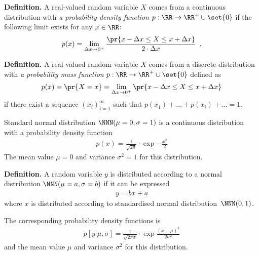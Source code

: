 \documentclass[landscape,footrule]{foils}
\begin{document}
\titlefoil




\textbf{Definition.}
A real-valued random variable $X$ comes from a continuous distribution with \emph{a probability density function} $p:\RR\to\RR^+\cup\set{0}$ if the following limit exists for any $x\in\RR$:
\begin{align*}
p(x)=\lim_{\Delta x \to 0^+} \frac{\pr{x -\Delta x \leq X\leq x+\Delta x}}{2\cdot \Delta x}\enspace.
\end{align*} 




\textbf{Definition.}
A real-valued random variable $X$ comes from a discrete distribution with \emph{a probability mass function} $p:\RR\to\RR^+\cup\set{0}$ defined as 
\begin{align*}
p(x)=\pr{X=x}=\lim_{\Delta x \to 0^+} \pr{x-\Delta x \leq X\leq x+\Delta x}
\end{align*}  
if there exist a sequence $(x_i)_{i=1}^\infty$ such that $p(x_1)+\ldots+p(x_i)+\ldots =1$.




Standard normal distribution $\NNN(\mu=0,\sigma=1)$ is a continuous distribution with a probability density function 
\begin{align*}
p(x)=\frac{1}{\sqrt{2\pi}}\cdot\exp{-\frac{x^2}{2}}
\end{align*}
The mean value $\mu=0$ and variance $\sigma^2=1$ for this distribution.



\textbf{Definition.}
A random variable $y$ is distributed according to a normal distribution $\NNN(\mu=a,\sigma=b)$ if it can be expressed 
\begin{align*}
y=bx+a
\end{align*}
where $x$ is distributed according to standardised normal distribution~$\NNN(0,1)$. \vspace*{1cm}

The corresponding probability density functions is
\begin{align*}
p[y|\mu,\sigma]=\frac{1}{\sqrt{2\pi\sigma}}\cdot\exp{\frac{(x-\mu)^2}{2\sigma^2}}
\end{align*}
and the mean value $\mu$ and variance $\sigma^2$ for this distribution.
\end{document}
